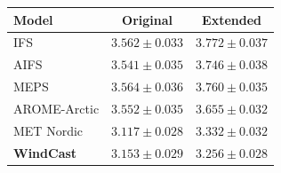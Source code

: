 \begin{tabular}{lcc}
\toprule
Model & Original & Extended \\
\midrule
IFS & $3.562 \pm 0.033$ & $3.772 \pm 0.037$ \\
AIFS & $3.541 \pm 0.035$ & $3.746 \pm 0.038$ \\
MEPS & $3.564 \pm 0.036$ & $3.760 \pm 0.035$ \\
AROME-Arctic & $3.552 \pm 0.035$ & $3.655 \pm 0.032$ \\
MET Nordic & $3.117 \pm 0.028$ & $3.332 \pm 0.032$ \\
\textbf{WindCast} & $\mathbf{3.153 \pm 0.029}$ & $\mathbf{3.256 \pm 0.028}$ \\
\bottomrule
\end{tabular}
